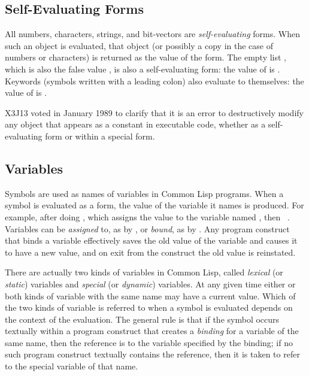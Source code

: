 \subsection{Self-Evaluating Forms}

All numbers, characters, strings, and bit-vectors
are \emph{self-evaluating} forms.
When such an object is evaluated, that object
(or possibly a copy in the case of numbers or characters)
is returned as the value
of the form.  The empty list {\emptylist}, which is also the false value {\false},
is also a self-evaluating form: the value of {\false} is {\false}.
Keywords (symbols written with a leading colon) also evaluate
to themselves: the value of  is .

\begin{newer}
X3J13 voted in January 1989  to clarify that
it is an error to destructively modify any object that appears as a constant
in executable code, whether as
a self-evaluating form or within a  special form.
\end{newer}

\subsection{Variables}

Symbols are used as names of variables in Common Lisp programs.
When a symbol is evaluated as a form, the value of the variable it names
is produced.  For example, after doing , which assigns
the value  to the variable named , then  \EV\ .
Variables can be \emph{assigned} to, as by , or \emph{bound},
as by .
Any program construct that binds a variable effectively saves the old
value of the variable and causes it to have a new value, and on exit from
the construct the old value is reinstated.

There are actually two kinds of variables in Common Lisp, called \emph{lexical} (or
\emph{static}) variables and \emph{special} (or \emph{dynamic}) variables.
At any given time either or both kinds of variable with the same name may
have a current value.  Which of the two kinds of variable is referred to
when a symbol is evaluated depends on the context of the evaluation.
The general rule is that if the symbol occurs textually within a program
construct that creates a \emph{binding} for a variable of the same name,
then the reference is to the variable specified by the binding;
if no such program construct textually contains the reference, then
it is taken to refer to the special variable of that name.

